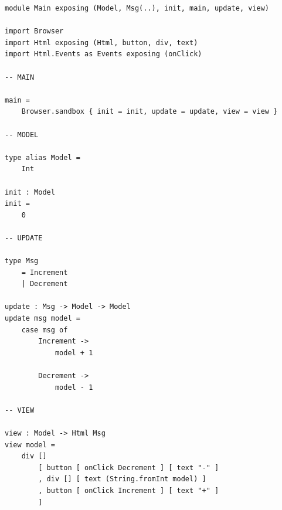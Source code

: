 \documentclass[../thesis.tex]{subfiles}
\begin{document}
\begin{example}\label{ex:elm_simple_program}
\begin{verbatim}
module Main exposing (Model, Msg(..), init, main, update, view)

import Browser
import Html exposing (Html, button, div, text)
import Html.Events as Events exposing (onClick)

-- MAIN

main =
    Browser.sandbox { init = init, update = update, view = view }

-- MODEL

type alias Model =
    Int

init : Model
init =
    0

-- UPDATE

type Msg
    = Increment
    | Decrement

update : Msg -> Model -> Model
update msg model =
    case msg of
        Increment ->
            model + 1

        Decrement ->
            model - 1

-- VIEW

view : Model -> Html Msg
view model =
    div []
        [ button [ onClick Decrement ] [ text "-" ]
        , div [] [ text (String.fromInt model) ]
        , button [ onClick Increment ] [ text "+" ]
        ]
\end{verbatim}
\end{example}
\end{document}
